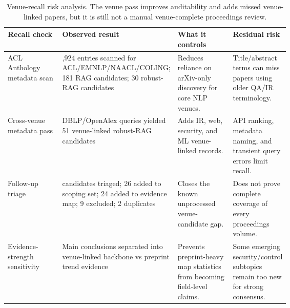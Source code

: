 \documentclass[11pt]{article}
\begin{document}
\begin{table}[t]
\centering
\scriptsize
\renewcommand{\arraystretch}{0.9}
\begin{tabularx}{\linewidth}{>{\raggedright\arraybackslash}p{0.20\linewidth}>{\raggedright\arraybackslash}p{0.24\linewidth}>{\raggedright\arraybackslash}p{0.20\linewidth}X}
\toprule
\textbf{Recall check} & \textbf{Observed result} & \textbf{What it controls} & \textbf{Residual risk} \\
\midrule
ACL Anthology metadata scan & 12,924 entries scanned for ACL/EMNLP/NAACL/COLING; 181 RAG candidates; 30 robust-RAG candidates & Reduces reliance on arXiv-only discovery for core NLP venues. & Title/abstract terms can miss papers using older QA/IR terminology. \\
Cross-venue metadata pass & DBLP/OpenAlex queries yielded 51 venue-linked robust-RAG candidates & Adds IR, web, security, and ML venue-linked records. & API ranking, metadata naming, and transient query errors limit recall. \\
Follow-up triage & 51 candidates triaged; 26 added to scoping set; 24 added to evidence map; 9 excluded; 2 duplicates & Closes the known unprocessed venue-candidate gap. & Does not prove complete coverage of every proceedings volume. \\
Evidence-strength sensitivity & Main conclusions separated into venue-linked backbone vs preprint trend evidence & Prevents preprint-heavy map statistics from becoming field-level claims. & Some emerging security/control subtopics remain too new for strong consensus. \\
\bottomrule
\end{tabularx}
\caption{Venue-recall risk analysis. The venue pass improves auditability and adds missed venue-linked papers, but it is still not a manual venue-complete proceedings review.}
\label{tab:venue-recall-risk}
\end{table}


\end{document}
